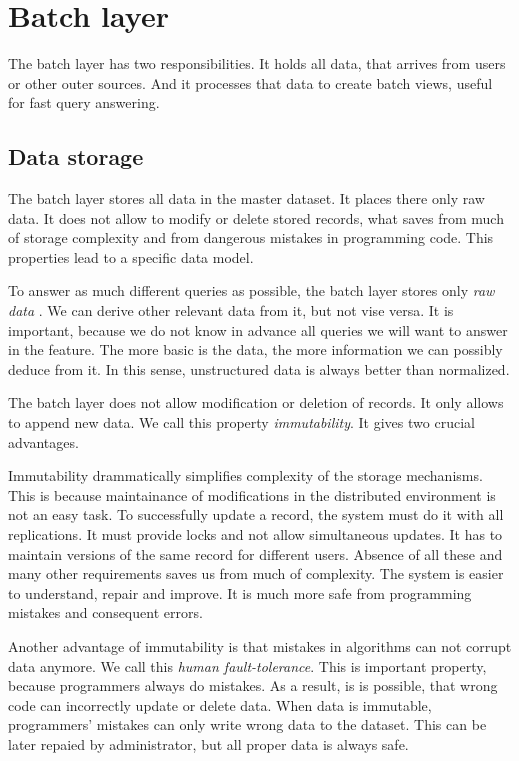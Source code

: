 \section{Batch layer}

The batch layer has two responsibilities.
It holds all data, that arrives from users or other outer sources.
And it processes that data to create batch views, useful for fast query answering.

\subsection{Data storage}

The batch layer stores all data in the master dataset.
It places there only raw data.
It does not allow to modify or delete stored records, what saves from much of storage complexity and from dangerous mistakes in programming code.
This properties lead to a specific data model.

To answer as much different queries as possible, the batch layer stores only \textit{raw data} .
We can derive other relevant data from it, but not vise versa.
It is important, because we do not know in advance all queries we will want to answer in the feature.
The more basic is the data, the more information we can possibly deduce from it.
In this sense, unstructured data is always better than normalized.

The batch layer does not allow modification or deletion of records.
It only allows to append new data.
We call this property \textit{immutability}.
It gives two crucial advantages.

Immutability drammatically simplifies complexity of the storage mechanisms.
This is because maintainance of modifications in the distributed environment is not an easy task.
To successfully update a record, the system must do it with all replications.
It must provide locks and not allow simultaneous updates.
It has to maintain versions of the same record for different users.
Absence of all these and many other requirements saves us from much of complexity.
The system is easier to understand, repair and improve.
It is much more safe from programming mistakes and consequent errors.

Another advantage of immutability is that mistakes in algorithms can not corrupt data anymore.
We call this \textit{human fault-tolerance}.
This is important property, because programmers always do mistakes.
As a result, is is possible, that wrong code can incorrectly update or delete data.
When data is immutable, programmers' mistakes can only write wrong data to the dataset.
This can be later repaied by administrator, but all proper data is always safe.

